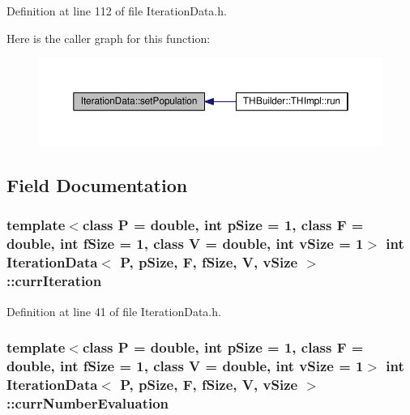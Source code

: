 Definition at line 112 of file Iteration\+Data.\+h.



Here is the caller graph for this function\+:\nopagebreak
\begin{figure}[H]
\begin{center}
\leavevmode
\includegraphics[width=350pt]{structIterationData_a891c2a7e6d8f1134dece070ecab16afd_icgraph}
\end{center}
\end{figure}




\subsection{Field Documentation}
\subsubsection[{\texorpdfstring{curr\+Iteration}{currIteration}}]{\setlength{\rightskip}{0pt plus 5cm}template$<$class P = double, int p\+Size = 1, class F = double, int f\+Size = 1, class V = double, int v\+Size = 1$>$ int {\bf Iteration\+Data}$<$ P, p\+Size, F, f\+Size, V, v\+Size $>$\+::curr\+Iteration}\hypertarget{structIterationData_a4868b1453ea6cb512ca4b3b91aa9aa46}{}\label{structIterationData_a4868b1453ea6cb512ca4b3b91aa9aa46}


Definition at line 41 of file Iteration\+Data.\+h.

\subsubsection[{\texorpdfstring{curr\+Number\+Evaluation}{currNumberEvaluation}}]{\setlength{\rightskip}{0pt plus 5cm}template$<$class P = double, int p\+Size = 1, class F = double, int f\+Size = 1, class V = double, int v\+Size = 1$>$ int {\bf Iteration\+Data}$<$ P, p\+Size, F, f\+Size, V, v\+Size $>$\+::curr\+Number\+Evaluation}\hypertarget{structIterationData_a3ebd4afd41be1657a42d79b053896a43}{}\label{structIterationData_a3ebd4afd41be1657a42d79b053896a43}


